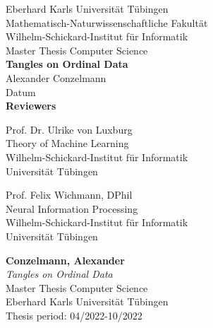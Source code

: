 \documentclass[twoside,12pt,a4paper]{report}
\begin{document}
 
\begin{titlepage}
 \begin{center}
  {\LARGE Eberhard Karls Universit\"at T\"ubingen}\\
  {\large Mathematisch-Naturwissenschaftliche Fakult\"at \\
Wilhelm-Schickard-Institut f\"ur Informatik\\[4cm]}
  {\huge Master Thesis Computer Science\\[2cm]}
  {\Large\bf  Tangles on Ordinal Data\\[1.5cm]}
 {\large Alexander Conzelmann}\\[0.5cm]
Datum\\[4cm]
{\small\bf Reviewers}\\[0.5cm]
  \parbox{7cm}{\begin{center}{\large Prof. Dr. Ulrike von Luxburg}\\
   Theory of Machine Learning\\
  {\footnotesize Wilhelm-Schickard-Institut f\"ur Informatik\\
	Universit\"at T\"ubingen}\end{center}}\hfill\parbox{7cm}{\begin{center}
  {\large Prof. Felix Wichmann, DPhil}\\
  Neural Information Processing\\
  {\footnotesize Wilhelm-Schickard-Institut f\"ur Informatik\\
	Universit\"at T\"ubingen}\end{center}
 }
  \end{center}
\end{titlepage}


\thispagestyle{empty}
\vspace*{\fill}
\begin{minipage}{11.2cm}
\textbf{Conzelmann, Alexander}\\
\emph{Tangles on Ordinal Data}\\ Master Thesis Computer Science\\
Eberhard Karls Universit\"at T\"ubingen\\
Thesis period: 04/2022-10/2022
\end{minipage}
\newpage
\end{document}
